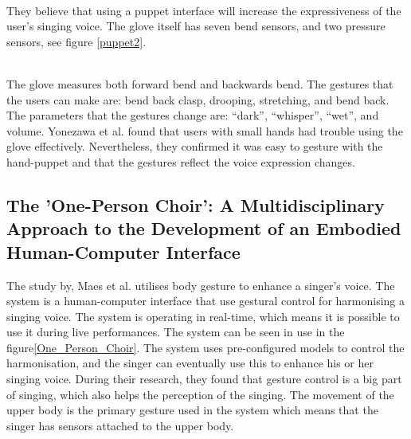 \begin{minipage}{\linewidth}%
\label{puppet1}
\end{minipage}\\

They believe that using a puppet interface will increase the expressiveness of the user’s singing voice. The glove itself has seven bend sensors, and two pressure sensors, see figure \ref{puppet2}. \\

\begin{minipage}{\linewidth}%
\label{puppet2}
\end{minipage}\\

The glove measures both forward bend and backwards bend. The gestures that the users can make are: bend back clasp, drooping, stretching, and bend back. The parameters that the gestures change are: “dark”, “whisper”, “wet”, and volume. Yonezawa et al. found that users with small hands had trouble using the glove effectively. Nevertheless, they confirmed it was easy to gesture with the hand-puppet and that the gestures reflect the voice expression changes.

\subsection{The 'One-Person Choir': A Multidisciplinary Approach to the Development of an Embodied Human-Computer Interface}
The study by, Maes et al. \citep{Maes_2011} utilises body gesture to enhance a singer's voice. The system is a human-computer interface that use gestural control for harmonising a singing voice. The system is operating in real-time, which means it is possible to use it during live performances. The system can be seen in use in the figure\ref{One_Person_Choir}. The system uses pre-configured models to control the harmonisation, and the singer can eventually use this to enhance his or her singing voice. 
During their research, they found that gesture control is a big part of singing, which also helps the perception of the singing. The movement of the upper body is the primary gesture used in the system which means that the singer has sensors attached to the upper body.\\

